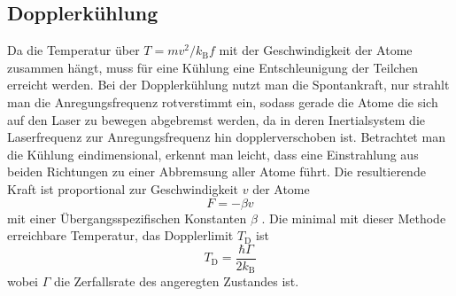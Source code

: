 \documentclass[twoside,colorback,accentcolor=tud4c,11pt]{tudreport}
\begin{document}
\subsection{Dopplerkühlung}\label{subsec:doppler}
Da die Temperatur über $ T=mv^2/k_\text{B}f $ mit der Geschwindigkeit der Atome zusammen hängt, muss für eine Kühlung eine Entschleunigung der Teilchen erreicht werden. Bei der Dopplerkühlung nutzt man die Spontankraft, nur strahlt man die Anregungsfrequenz rotverstimmt ein, sodass gerade die Atome die sich auf den Laser zu bewegen abgebremst werden, da in deren Inertialsystem die Laserfrequenz zur Anregungsfrequenz hin dopplerverschoben ist. Betrachtet man die Kühlung eindimensional, erkennt man leicht, dass eine Einstrahlung aus beiden Richtungen zu einer Abbremsung aller Atome führt. Die resultierende Kraft ist proportional zur Geschwindigkeit $ v $ der Atome
\begin{equation}
F= -\beta v
\end{equation}
mit einer Übergangsspezifischen Konstanten $ \beta $ \cite{anl}. Die minimal mit dieser Methode erreichbare Temperatur, das Dopplerlimit $ T_\text{D} $ ist
\begin{equation}
T_\text{D}=\frac{\hbar\Gamma}{2k_\text{B}}
\end{equation}
wobei $ \Gamma $ die Zerfallsrate des angeregten Zustandes ist.
\end{document}
